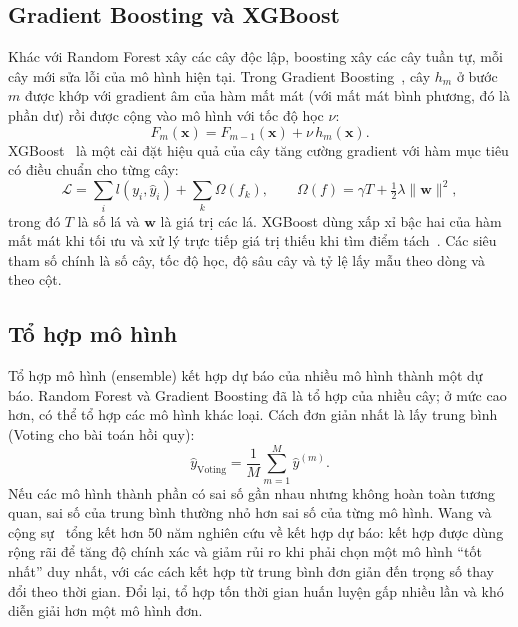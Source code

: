 \subsection{Gradient Boosting và XGBoost}
Khác với Random Forest xây các cây độc lập, boosting xây các cây tuần tự, mỗi cây mới sửa lỗi của mô hình hiện tại. Trong Gradient Boosting~\cite{friedman2001greedy}, cây $h_m$ ở bước $m$ được khớp với gradient âm của hàm mất mát (với mất mát bình phương, đó là phần dư) rồi được cộng vào mô hình với tốc độ học $\nu$:
\begin{equation}
    F_m(\mathbf{x}) = F_{m-1}(\mathbf{x}) + \nu\, h_m(\mathbf{x}).
    \label{eq:gb}
\end{equation}
XGBoost~\cite{chen2016xgboost} là một cài đặt hiệu quả của cây tăng cường gradient với hàm mục tiêu có điều chuẩn cho từng cây:
\begin{equation}
    \mathcal{L} = \sum_{i} l(y_i, \hat{y}_i) + \sum_{k} \Omega(f_k), \qquad \Omega(f) = \gamma T + \tfrac{1}{2}\lambda \lVert \mathbf{w} \rVert^2,
    \label{eq:xgb}
\end{equation}
trong đó $T$ là số lá và $\mathbf{w}$ là giá trị các lá. XGBoost dùng xấp xỉ bậc hai của hàm mất mát khi tối ưu và xử lý trực tiếp giá trị thiếu khi tìm điểm tách~\cite{chen2016xgboost}. Các siêu tham số chính là số cây, tốc độ học, độ sâu cây và tỷ lệ lấy mẫu theo dòng và theo cột.

\subsection{Tổ hợp mô hình}
Tổ hợp mô hình (ensemble) kết hợp dự báo của nhiều mô hình thành một dự báo. Random Forest và Gradient Boosting đã là tổ hợp của nhiều cây; ở mức cao hơn, có thể tổ hợp các mô hình khác loại. Cách đơn giản nhất là lấy trung bình (Voting cho bài toán hồi quy):
\begin{equation}
    \hat{y}_{\text{Voting}} = \frac{1}{M}\sum_{m=1}^{M} \hat{y}^{(m)} .
    \label{eq:voting}
\end{equation}
Nếu các mô hình thành phần có sai số gần nhau nhưng không hoàn toàn tương quan, sai số của trung bình thường nhỏ hơn sai số của từng mô hình. Wang và cộng sự~\cite{wang2023forecast} tổng kết hơn 50 năm nghiên cứu về kết hợp dự báo: kết hợp được dùng rộng rãi để tăng độ chính xác và giảm rủi ro khi phải chọn một mô hình ``tốt nhất'' duy nhất, với các cách kết hợp từ trung bình đơn giản đến trọng số thay đổi theo thời gian. Đổi lại, tổ hợp tốn thời gian huấn luyện gấp nhiều lần và khó diễn giải hơn một mô hình đơn.

